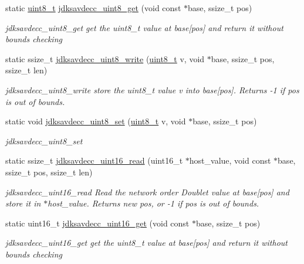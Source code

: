 \begin{DoxyCompactItemize}
static \hyperlink{stdint_8h_aba7bc1797add20fe3efdf37ced1182c5}{uint8\+\_\+t} \hyperlink{group__endian_ga27091e0bf32429d162f641a3f4bc933f}{jdksavdecc\+\_\+uint8\+\_\+get} (void const $\ast$base, ssize\+\_\+t pos)
\begin{DoxyCompactList}\small\item\em jdksavdecc\+\_\+uint8\+\_\+get get the uint8\+\_\+t value at base\mbox{[}pos\mbox{]} and return it without bounds checking \end{DoxyCompactList}\item 
static ssize\+\_\+t \hyperlink{group__endian_ga76773f9a39ae810aec586d2bb3b617e5}{jdksavdecc\+\_\+uint8\+\_\+write} (\hyperlink{stdint_8h_aba7bc1797add20fe3efdf37ced1182c5}{uint8\+\_\+t} v, void $\ast$base, ssize\+\_\+t pos, ssize\+\_\+t len)
\begin{DoxyCompactList}\small\item\em jdksavdecc\+\_\+uint8\+\_\+write store the uint8\+\_\+t value v into base\mbox{[}pos\mbox{]}. Returns -\/1 if pos is out of bounds. \end{DoxyCompactList}\item 
static void \hyperlink{group__endian_gaec8c2ce2f0bb781c6d77bd6a16b3ddcb}{jdksavdecc\+\_\+uint8\+\_\+set} (\hyperlink{stdint_8h_aba7bc1797add20fe3efdf37ced1182c5}{uint8\+\_\+t} v, void $\ast$base, ssize\+\_\+t pos)
\begin{DoxyCompactList}\small\item\em jdksavdecc\+\_\+uint8\+\_\+set \end{DoxyCompactList}\item 
static ssize\+\_\+t \hyperlink{group__endian_ga3e36550dbba4c49bb6855996b12062ea}{jdksavdecc\+\_\+uint16\+\_\+read} (uint16\+\_\+t $\ast$host\+\_\+value, void const $\ast$base, ssize\+\_\+t pos, ssize\+\_\+t len)
\begin{DoxyCompactList}\small\item\em jdksavdecc\+\_\+uint16\+\_\+read Read the network order Doublet value at base\mbox{[}pos\mbox{]} and store it in $\ast$host\+\_\+value. Returns new pos, or -\/1 if pos is out of bounds. \end{DoxyCompactList}\item 
static uint16\+\_\+t \hyperlink{group__endian_ga3fbbbc20be954aa61e039872965b0dc9}{jdksavdecc\+\_\+uint16\+\_\+get} (void const $\ast$base, ssize\+\_\+t pos)
\begin{DoxyCompactList}\small\item\em jdksavdecc\+\_\+uint16\+\_\+get get the uint8\+\_\+t value at base\mbox{[}pos\mbox{]} and return it without bounds checking \end{DoxyCompactList}\item 

\end{DoxyCompactItemize}
